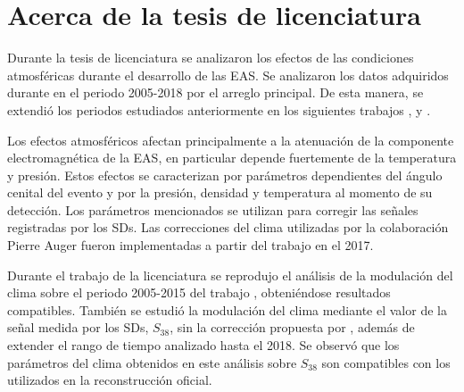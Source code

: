 \section{Acerca de la tesis de licenciatura}

Durante la tesis de licenciatura se analizaron los efectos de las condiciones atmosféricas durante el desarrollo de las EAS.  Se analizaron los datos adquiridos durante en el periodo 2005-2018 por el arreglo principal. De esta manera, se extendió los periodos estudiados anteriormente en los siguientes trabajos \cite{abraham2009atmospheric}, \cite{abreu2012description}   y \cite{aab2017impact}. 

Los efectos atmosféricos afectan principalmente a la atenuación de la componente electromagnética  de la EAS, en particular depende fuertemente de la temperatura y presión. Estos efectos  se caracterizan por parámetros dependientes del ángulo cenital del evento y por la presión, densidad y temperatura al momento de su detección. Los parámetros mencionados se utilizan para corregir las señales registradas por los SDs. Las correcciones del clima utilizadas por la colaboración Pierre Auger fueron implementadas a partir del trabajo \cite{aab2017impact} en el 2017. 

Durante el trabajo de la licenciatura se reprodujo el análisis de la modulación del clima sobre el periodo 2005-2015 del trabajo \cite{aab2017impact}, obteniéndose resultados compatibles. También se estudió la modulación del clima mediante el valor de la señal medida por los SDs, $S_{38}$, sin la corrección propuesta por \cite{aab2017impact}, además de extender el rango de tiempo analizado hasta el 2018. Se observó que los parámetros del clima obtenidos en este análisis sobre  $S_{38}$  son compatibles con los utilizados en la reconstrucción oficial. 